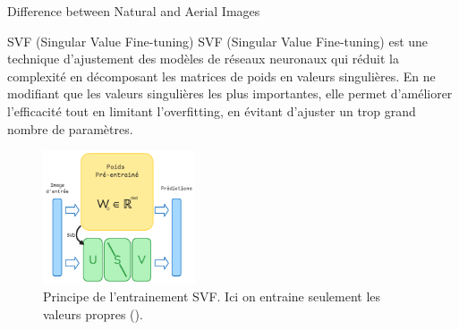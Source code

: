 \begin{subsectionframemod}{Difference between Natural and Aerial Images}
    \begin{alertblock}{SVF (Singular Value Fine-tuning)}
        SVF (Singular Value Fine-tuning) est une technique d'ajustement des modèles de réseaux neuronaux qui réduit la complexité en décomposant les matrices de poids en valeurs singulières.
        En ne modifiant que les valeurs singulières les plus importantes, elle permet d'améliorer l'efficacité tout en limitant l'overfitting, en évitant d'ajuster un trop grand nombre de paramètres.
    \end{alertblock}

    \begin{figure}
        \includegraphics[width=0.4\textwidth]{Figures/svf.png}
        \caption{Principe de l'entrainement SVF. Ici on entraine seulement les valeurs propres (\cite{sun2022singular}).}
    \end{figure}


\end{subsectionframemod}